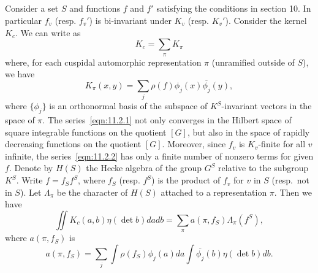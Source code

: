 \subsection{}
Consider a set $S$ and functions $f$ and $f'$ satisfying the conditions in section 10.
In particular $f_v$ (resp. $f_v'$) is bi-invariant under $K_v$ (resp. $K_v'$).
Consider the kernel $K_c$.
We can write as
\begin{equation}
    \label{eqn:11.2.1}
    K_c = \sum_{\pi} K_\pi
\end{equation}
where, for each cuspidal automorphic representation $\pi$ (unramified outside of $S$), we have
\begin{equation}
    \label{eqn:11.2.2}
    K_\pi(x, y) = \sum_{j} \rho(f) \phi_j(x) \overline{\phi_j}(y),
\end{equation}
where $\{\phi_j\}$ is an orthonormal basis of the subspace of $K^S$-invariant vectors in the space of $\pi$.
The series~\eqref{eqn:11.2.1} not only converges in the Hilbert space of square integrable functions on the quotient $[G]$, but also in the space of rapidly decreasing functions on the quotient $[G]$.
Moreover, since $f_v$ is $K_v$-finite for all $v$ infinite, the series~\eqref{eqn:11.2.2} has only a finite number of nonzero terms for given $f$.
Denote by $H(S)$ the Hecke algebra of the group $G^S$ relative to the subgroup $K^S$. 
Write $f = f_S f^S$, where $f_S$ (resp. $f^S$) is the product of $f_v$ for $v$ in $S$ (resp.\ not in $S$).
Let $\Lambda_\pi$ be the character of $H(S)$ attached to a representation $\pi$.
Then we have
\begin{equation}
    \iint K_c(a, b) \eta(\det b) dadb = \sum_{\pi} a(\pi, f_S) \Lambda_\pi(f^S),
\end{equation}
where $a(\pi, f_S)$ is
\begin{equation}
    a(\pi, f_S) = \sum_j \int \rho(f_S) \phi_j(a) da \int \overline{\phi_j}(b) \eta(\det b) db.
\end{equation}


